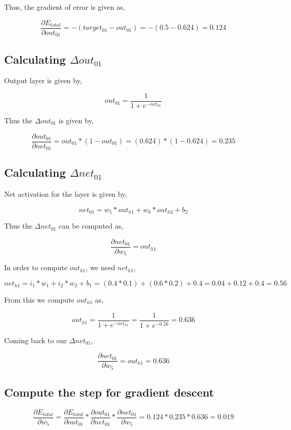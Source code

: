 \documentclass[a4paper, 11pt]{article}
\begin{document}
\noindent Thus, the gradient of error is given as,

$$ \frac{\partial E_{total}}{\partial out_{01}} =  -(target_{01} - out_{01}) = -(0.5 - 0.624) = 0.124$$

\subsection*{Calculating $\Delta out_{01}$}

Output layer is given by,

$$ out_{01} = \frac{1}{1+e^{-net_{01}}}$$

\noindent Thus the $\Delta out_{01}$ is given by,

$$ \frac{\partial out_{01}}{\partial net_{01}} = out_{01} * (1 - out_{01}) = (0.624) * (1 - 0.624) = 0.235$$

\subsection*{Calculating $\Delta net_{01}$}

Net activation for the layer is given by,

$$ net_{01} = w_5 * out_{h1} + w_6 * out_{h2} + b_2$$

\noindent Thus the $\Delta net_{01}$ can be computed as,

$$ \frac{\partial net_{01}}{\partial w_5} = out_{h1} $$

\noindent In order to compute $out_{h1}$, we need $net_{h1}$,

$$ net_{h1} = i_1*w_1 + i_2 * w_2 + b_1 = (0.4*0.1) + (0.6*0.2) + 0.4 = 0.04 + 0.12 + 0.4 = 0.56$$

\noindent From this we compute $out_{h1}$ as,

$$ out_{h1} = \frac{1}{1+e^{-net_{h1}}} = \frac{1}{1+e^{-0.56}} = 0.636$$

\noindent Coming back to our $\Delta net_{01}$,

$$ \frac{\partial net_{01}}{\partial w_5} = out_{h1} = 0.636$$

\subsection*{Compute the step for gradient descent}

$$\frac{\partial E_{total}}{\partial w_5} = \frac{\partial E_{total}}{\partial out_{01}} * \frac{\partial out_{01}}{\partial net_{01}} * \frac{\partial net_{01}}{\partial w_5} = 0.124 * 0.235 * 0.636 = 0.019$$
\end{document}
